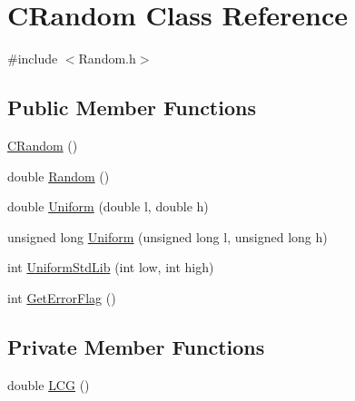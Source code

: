 \hypertarget{classCRandom}{
\section{CRandom Class Reference}
\label{classCRandom}
}


{\ttfamily \#include $<$Random.h$>$}\subsection*{Public Member Functions}
\begin{DoxyCompactItemize}
\item 
\hyperlink{classCRandom_a5f9d8f408ffab0a25630e8d4f529294a}{CRandom} ()
\item 
double \hyperlink{classCRandom_ae63e58f1c95ebb7e9e80e5c5fe37eb34}{Random} ()
\item 
double \hyperlink{classCRandom_a9f7a991be94c453958411fb96bea1320}{Uniform} (double l, double h)
\item 
unsigned long \hyperlink{classCRandom_a12c39e3dbb6b13583cb320c56b1f29f5}{Uniform} (unsigned long l, unsigned long h)
\item 
int \hyperlink{classCRandom_a1dd4e0c3ac3dbe68549b8ce1f1c94f45}{UniformStdLib} (int low, int high)
\item 
int \hyperlink{classCRandom_a662c309ef5b0164bb5efb4d79b7813a0}{GetErrorFlag} ()
\end{DoxyCompactItemize}
\subsection*{Private Member Functions}
\begin{DoxyCompactItemize}
\item 
double \hyperlink{classCRandom_a029fd3f1f77bd26afd46efddedfc53b0}{LCG} ()
\end{DoxyCompactItemize}
